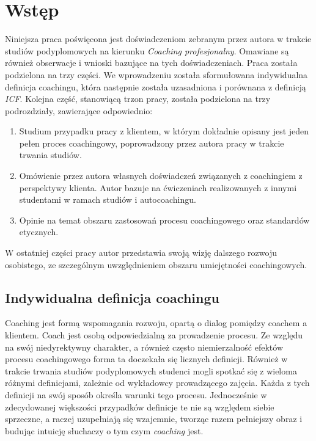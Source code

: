 \chapter{Wstęp}


Niniejsza praca poświęcona jest doświadczeniom zebranym przez autora w trakcie studiów podyplomowych na kierunku
\emph{Coaching profesjonalny}. Omawiane są również obserwacje i wnioski bazujące na tych doświadczeniach.
Praca została podzielona na trzy części. We wprowadzeniu została sformułowana indywidualna definicja coachingu,
która następnie została uzasadniona i porównana z definicją \emph{ICF}. Kolejna część, stanowiącą trzon pracy,
została podzielona na trzy podrozdziały, zawierające odpowiednio:
\begin{enumerate}
  \item Studium przypadku pracy z klientem, w którym dokładnie opisany jest jeden pełen proces coachingowy, poprowadzony
      przez autora pracy w trakcie trwania studiów.
  \item Omówienie przez autora własnych doświadczeń związanych z coachingiem z perspektywy klienta. Autor bazuje na
      ćwiczeniach realizowanych z innymi studentami w ramach studiów i autocoachingu.
  \item Opinie na temat obszaru zastosowań procesu coachingowego oraz standardów etycznych.
\end{enumerate}
W ostatniej części pracy autor przedstawia swoją wizję dalszego rozwoju osobistego, ze szczególnym uwzględnieniem
obszaru umiejętności coachingowych. \\

\section{Indywidualna definicja coachingu}
Coaching jest formą wspomagania rozwoju, opartą o dialog pomiędzy coachem a klientem. Coach jest osobą odpowiedzialną za prowadzenie procesu.
Ze względu na swój niedyrektywny charakter, a również często niemierzalność efektów procesu coachingowego forma ta doczekała się
licznych definicji. Również w trakcie trwania studiów podyplomowych studenci mogli spotkać się z wieloma różnymi definicjami,
zależnie od wykładowcy prowadzącego zajęcia. Każda z tych definicji na swój sposób określa warunki tego procesu.
Jednocześnie w zdecydowanej większości przypadków definicje te nie są względem siebie sprzeczne, a raczej uzupełniają się
wzajemnie, tworząc razem pełniejszy obraz i budując intuicję słuchaczy o tym czym \emph{coaching} jest.

